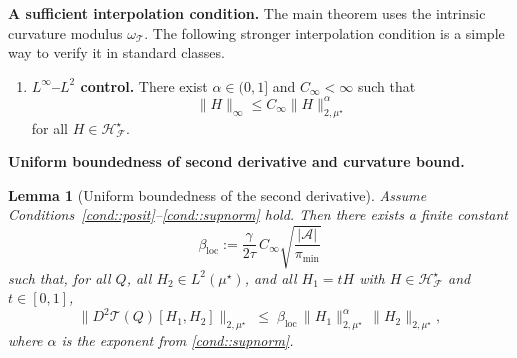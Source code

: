 \documentclass{article}
\newcommand{\loc}{\mathrm{loc}}
\theoremstyle{plain}
\newtheorem{lemma}{Lemma}
\theoremstyle{definition}
\theoremstyle{remark}
\begin{document}
\textbf{A sufficient interpolation condition.}
The main theorem uses the intrinsic curvature modulus
\(\omega_{\mathcal T}\). The following stronger interpolation condition is a
simple way to verify it in standard classes.
\begin{enumerate}[label=\textbf{S\arabic*)}, ref={S\arabic*}, leftmargin=1.5em]
\item \label{cond::supnorm}
\textbf{\(L^\infty\)--\(L^2\) control.}
There exist \(\alpha\in(0,1]\) and \(C_\infty<\infty\) such that
\[
\|H\|_\infty
\le
C_\infty\|H\|_{2,\mu^\star}^{\alpha}
\]
for all \(H\in\mathcal H_{\mathcal F}^\star\).
\end{enumerate}



\textbf{Uniform boundedness of second derivative and curvature bound.}
\begin{lemma}[Uniform boundedness of the second derivative]
\label{lem:second-derivative-bounded}
Assume Conditions~\ref{cond::posit}–\ref{cond::supnorm} hold. Then there exists a finite constant
\[
\beta_{\loc}
:=
\frac{\gamma}{2\tau}\,
C_{\infty}\sqrt{\frac{|\mathcal{A}|}{\pi_{\min}}}
\]
such that, for all \(Q\), all \(H_2\in L^2(\mu^\star)\), and all
\(H_1=tH\) with \(H\in\mathcal H_{\mathcal F}^\star\) and \(t\in[0,1]\),
\begin{equation}
\label{eq:second-derivative-op-bound}
\bigl\|D^2\mathcal{T}(Q)[H_1,H_2]\bigr\|_{2,\mu^\star}
\;\le\;
\beta_{\loc}\,
\|H_1\|_{2,\mu^\star}^{\alpha}\,
\|H_2\|_{2,\mu^\star},
\end{equation}
where $\alpha$ is the exponent from \ref{cond::supnorm}.
\end{lemma}
\end{document}
